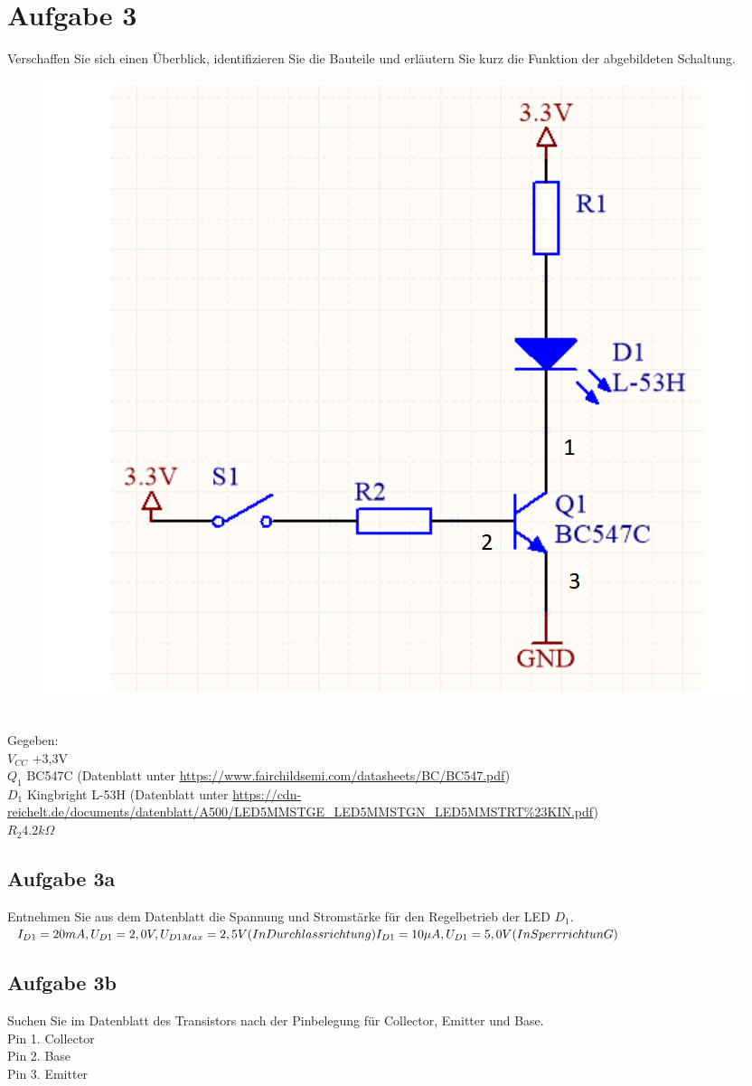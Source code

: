 \section{Aufgabe 3}
	Verschaffen Sie sich einen Überblick, identifizieren Sie die Bauteile und erläutern Sie kurz die Funktion der abgebildeten Schaltung.\\
	\begin{figure}[h]
		\centering
		\includegraphics[width=0.4\linewidth]{images/Transistor_Schaltung}
		\caption{}
		\label{fig:Transistor_Schaltung}
	\end{figure}
	\\Gegeben: \\
	$V_{CC}$ +3,3V\\
	$Q_{1}$ BC547C (Datenblatt unter \url{https://www.fairchildsemi.com/datasheets/BC/BC547.pdf})\\
	$D_{1}$ Kingbright L-53H (Datenblatt unter \url{https://cdn-reichelt.de/documents/datenblatt/A500/LED5MMSTGE\_LED5MMSTGN\_LED5MMSTRT\%23KIN.pdf})\\	
	$R_{2} 4.2 k\Omega$\\
	\subsection{Aufgabe 3a}
		Entnehmen Sie aus dem Datenblatt die Spannung und Stromstärke für den Regelbetrieb der LED $D_{1}$.\\
		$
		I_{D1} = 20mA, U_{D1} = 2,0V, U_{D1Max} = 2,5V (In Durchlassrichtung)\\
		I_{D1} = 10\mu A, U_{D1} = 5,0V (In SperrrichtunG)\\
		$
	\subsection{Aufgabe 3b}
		Suchen Sie im Datenblatt des Transistors nach der Pinbelegung für Collector, Emitter und Base.\\
		Pin 1. Collector\\
		Pin 2. Base\\
		Pin 3. Emitter\\
